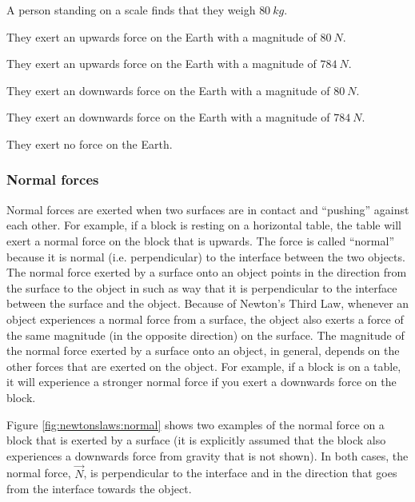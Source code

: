 \begin{checkpointMC}{A person standing on a scale finds that they weigh $\SI{80}{kg}$.}
\item They exert an upwards force on the Earth with a magnitude of $\SI{80}{N}$.
\item They exert an upwards force on the Earth with a magnitude of $\SI{784}{N}$.%
\item They exert an downwards force on the Earth with a magnitude of $\SI{80}{N}$.
\item They exert an downwards force on the Earth with a magnitude of $\SI{784}{N}$.
\item They exert no force on the Earth.
\end{checkpointMC}


\subsubsection{Normal forces}
Normal forces are exerted when two surfaces are in contact and ``pushing'' against each other. For example, if a block is resting on a horizontal table, the table will exert a normal force on the block that is upwards. The force is called ``normal'' because it is normal (i.e. perpendicular) to the interface between the two objects. The normal force exerted by a surface onto an object points in the direction from the surface to the object in such as way that it is perpendicular to the interface between the surface and the object. Because of Newton's Third Law, whenever an object experiences a normal force from a surface, the object also exerts a force of the same magnitude (in the opposite direction) on the surface. The magnitude of the normal force exerted by a surface onto an object, in general, depends on the other forces that are exerted on the object. For example, if a block is on a table, it will experience a stronger normal force if you exert a downwards force on the block.

Figure \ref{fig:newtonslaws:normal} shows two examples of the normal force on a block that is exerted by a surface (it is explicitly assumed that the block also experiences a downwards force from gravity that is not shown). In both cases, the normal force, $\vec N$, is perpendicular to the interface and in the direction that goes from the interface towards the object.



